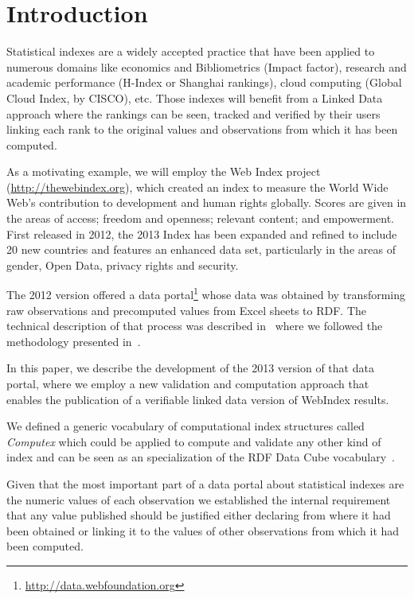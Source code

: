 \documentclass{llncs}
\newcommand{\footnoteUrl}[1]{\footnote{\url{#1}}}
\begin{document}
\section{Introduction}

Statistical indexes are a widely accepted practice that have been applied 
to numerous domains like economics and Bibliometrics (Impact factor), 
research and academic performance (H-Index or Shanghai rankings), 
cloud computing (Global Cloud Index, by CISCO), 
etc. 
Those indexes will benefit from a 
 Linked Data approach where the rankings can be seen, tracked and 
 verified by their users linking each rank to the original values and observations 
 from which it has been computed.

As a motivating example, we will employ the Web Index project
(\url{http://thewebindex.org}), which created an index to measure the World Wide Web’s 
contribution to development and human rights globally. Scores are given in the areas of access; freedom and openness; relevant content; and empowerment. 
First released in 2012, the 2013 Index has been expanded and refined to include 20 new countries and features an enhanced data set, particularly in the areas of gender, Open Data, privacy rights and security.

The 2012 version offered a data
portal\footnoteUrl{http://data.webfoundation.org} whose data was obtained 
by transforming raw observations and precomputed values 
from Excel sheets to RDF. 
The technical description of that process was described in~\cite{Alvarez13} where we followed
the methodology presented in~\cite{Silva11}. 

In this paper, we describe the development of the 2013 version of that data portal, where we employ 
a new validation and computation approach that enables the publication of a verifiable linked data version of WebIndex results.

We defined a generic vocabulary 
of computational index structures called \emph{Computex} which could be applied to compute 
and validate any other kind of index and can be seen as an specialization of the RDF Data Cube vocabulary~\cite{Cube}.

Given that the most important part of a data portal about statistical indexes are the 
numeric values of each observation we established the internal requirement that any value published should be justified either declaring from where it had been obtained or
linking it to the values of other observations
from which it had been computed.
\end{document}

